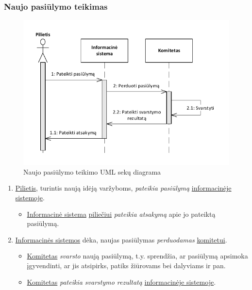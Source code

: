 \documentclass{VUMIFPSkursinis}
\begin{document}
    \subsubsection*{Naujo pasiūlymo teikimas}
	
	    \begin{figure}[H]
			\centering
			\includegraphics[width=\textwidth]{img/IsPSI1ScenarijausSekuDiagrama3}
			\caption{Naujo pasiūlymo teikimo UML sekų diagrama}
			\label{fig:scenarijusPasiulymoSekuDiagrama}
		\end{figure}
      
		\begin{enumerate}
			\item \underline{Pilietis}, turintis naują idėją varžyboms, \textit{pateikia pasiūlymą} \underline{informacinėje sistemoje}.
			\begin{itemize}
				\item \underline{Informacinė sistema} \underline{piliečiui} \textit{pateikia atsakymą} apie jo pateiktą pasiūlymą.
			\end{itemize}
			\item \underline{Informacinės sistemos} dėka, naujas pasiūlymas \textit{perduodamas} \underline{komitetui}.
			\begin{itemize}
				\item \underline{Komitetas} \textit{svarsto} naują pasiūlymą, t.y. sprendžia, ar pasiūlymą apsimoka įgyvendinti, ar jis atsipirks, patiks žiūrovams bei dalyviams ir pan.
				\item \underline{Komitetas} \textit{pateikia svarstymo rezultatą} \underline{informacinėje sistemoje}.
			\end{itemize}
		\end{enumerate}
      
\end{document}
